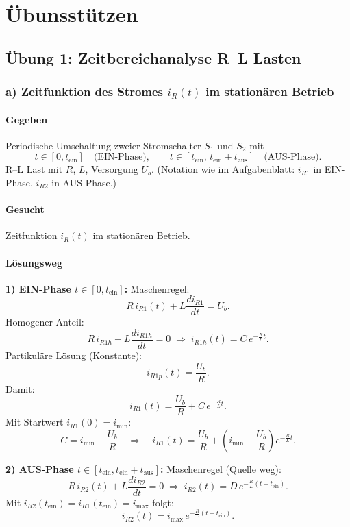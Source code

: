 \section{Übunsstützen}
\subsection{Übung 1: Zeitbereichanalyse R--L Lasten}

\subsubsection*{a) Zeitfunktion des Stromes $i_R(t)$ im stationären Betrieb}

\paragraph{Gegeben}
Periodische Umschaltung zweier Stromschalter $S_1$ und $S_2$ mit
\[
t\in[0,t_\mathrm{ein}] \quad \text{(EIN-Phase)}, 
\qquad
t\in[t_\mathrm{ein},\,t_\mathrm{ein}+t_\mathrm{aus}] \quad \text{(AUS-Phase)}.
\]
R--L Last mit $R$, $L$, Versorgung $U_b$.
(Notation wie im Aufgabenblatt: $i_{R1}$ in EIN-Phase, $i_{R2}$ in AUS-Phase.)

\paragraph{Gesucht}
Zeitfunktion $i_R(t)$ im stationären Betrieb.

\paragraph{Lösungsweg}
\textbf{1) EIN-Phase $t\in[0,t_\mathrm{ein}]$:}
Maschenregel:
\[
R\,i_{R1}(t) + L\frac{di_{R1}}{dt} = U_b.
\]
Homogener Anteil:
\[
R\,i_{R1h}+L\frac{di_{R1h}}{dt}=0
\;\Rightarrow\;
i_{R1h}(t)=C\,e^{-\frac{R}{L}t}.
\]
Partikuläre Lösung (Konstante):
\[
i_{R1p}(t)=\frac{U_b}{R}.
\]
Damit:
\[
i_{R1}(t)=\frac{U_b}{R}+C\,e^{-\frac{R}{L}t}.
\]
Mit Startwert $i_{R1}(0)=i_\mathrm{min}$:
\[
C=i_\mathrm{min}-\frac{U_b}{R}
\quad\Rightarrow\quad
\boxed{
i_{R1}(t)=\frac{U_b}{R}+\left(i_\mathrm{min}-\frac{U_b}{R}\right)e^{-\frac{R}{L}t}
}.
\]

\textbf{2) AUS-Phase $t\in[t_\mathrm{ein},t_\mathrm{ein}+t_\mathrm{aus}]$:}
Maschenregel (Quelle weg):
\[
R\,i_{R2}(t) + L\frac{di_{R2}}{dt} = 0
\;\Rightarrow\;
\boxed{
i_{R2}(t)=D\,e^{-\frac{R}{L}(t-t_\mathrm{ein})}
}.
\]
Mit $i_{R2}(t_\mathrm{ein})=i_{R1}(t_\mathrm{ein})=i_\mathrm{max}$ folgt:
\[
\boxed{
i_{R2}(t)=i_\mathrm{max}\,e^{-\frac{R}{L}(t-t_\mathrm{ein})}
}.
\]

